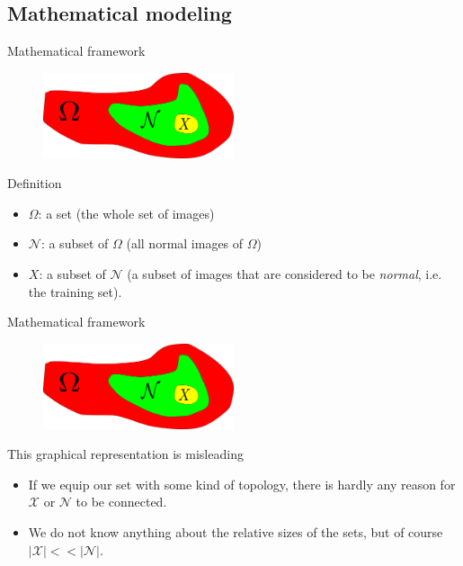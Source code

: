 \documentclass[xcolor=pdftex,dvipsnames,table,mathserif,aspectratio=169]{beamer}
\begin{document}
\subsection{Mathematical modeling}

\begin{frame}{Mathematical framework}

\begin{figure}[ht]
  \centering
  \includegraphics[width=0.5\textwidth]{sets}
\end{figure}


  \begin{block}{Definition}
\begin{itemize}
  \item $\Omega$: a set (the whole set of images)
  \item $\mathcal{N}$: a subset of $\Omega$ (all normal images of $\Omega$)
  \item $X$: a subset of $\mathcal{N}$ (a subset of images that are considered to be \emph{normal}, i.e. the \alert{training set}).
\end{itemize}
  \end{block}

\end{frame}


\begin{frame}{Mathematical framework}

\begin{figure}[ht]
  \centering
  \includegraphics[width=0.5\textwidth]{sets}
\end{figure}


\begin{alertblock}{This graphical representation is misleading}

\begin{itemize}
\item If we equip our set with some kind of topology, there is hardly any reason for $\mathcal{X}$ or $\mathcal{N}$ to be connected.
\item We do not know anything about the relative sizes of the sets, but of course $|\mathcal{X}| << |\mathcal{N}|$.
\end{itemize}

\end{alertblock}

\end{frame}
\end{document}
